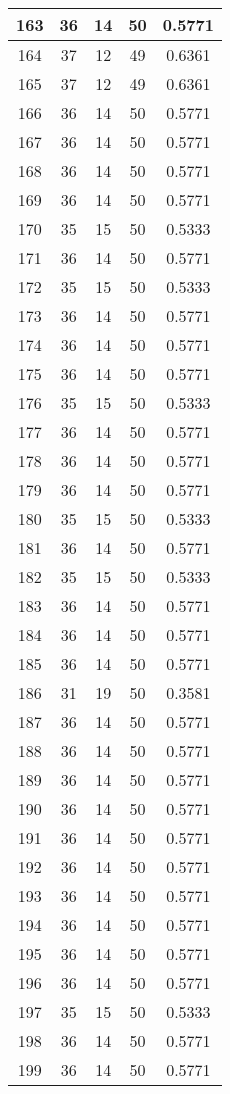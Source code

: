 \documentclass[letterpaper, 12pt]{article}
\begin{document}
\begin{longtable}{|c|c|c|c|c|}
\hline
163 & 36 & 14 & 50 & 0.5771 \\
\hline
164 & 37 & 12 & 49 & 0.6361 \\
\hline
165 & 37 & 12 & 49 & 0.6361 \\
\hline
166 & 36 & 14 & 50 & 0.5771 \\
\hline
167 & 36 & 14 & 50 & 0.5771 \\
\hline
168 & 36 & 14 & 50 & 0.5771 \\
\hline
169 & 36 & 14 & 50 & 0.5771 \\
\hline
170 & 35 & 15 & 50 & 0.5333 \\
\hline
171 & 36 & 14 & 50 & 0.5771 \\
\hline
172 & 35 & 15 & 50 & 0.5333 \\
\hline
173 & 36 & 14 & 50 & 0.5771 \\
\hline
174 & 36 & 14 & 50 & 0.5771 \\
\hline
175 & 36 & 14 & 50 & 0.5771 \\
\hline
176 & 35 & 15 & 50 & 0.5333 \\
\hline
177 & 36 & 14 & 50 & 0.5771 \\
\hline
178 & 36 & 14 & 50 & 0.5771 \\
\hline
179 & 36 & 14 & 50 & 0.5771 \\
\hline
180 & 35 & 15 & 50 & 0.5333 \\
\hline
181 & 36 & 14 & 50 & 0.5771 \\
\hline
182 & 35 & 15 & 50 & 0.5333 \\
\hline
183 & 36 & 14 & 50 & 0.5771 \\
\hline
184 & 36 & 14 & 50 & 0.5771 \\
\hline
185 & 36 & 14 & 50 & 0.5771 \\
\hline
186 & 31 & 19 & 50 & 0.3581 \\
\hline
187 & 36 & 14 & 50 & 0.5771 \\
\hline
188 & 36 & 14 & 50 & 0.5771 \\
\hline
189 & 36 & 14 & 50 & 0.5771 \\
\hline
190 & 36 & 14 & 50 & 0.5771 \\
\hline
191 & 36 & 14 & 50 & 0.5771 \\
\hline
192 & 36 & 14 & 50 & 0.5771 \\
\hline
193 & 36 & 14 & 50 & 0.5771 \\
\hline
194 & 36 & 14 & 50 & 0.5771 \\
\hline
195 & 36 & 14 & 50 & 0.5771 \\
\hline
196 & 36 & 14 & 50 & 0.5771 \\
\hline
197 & 35 & 15 & 50 & 0.5333 \\
\hline
198 & 36 & 14 & 50 & 0.5771 \\
\hline
199 & 36 & 14 & 50 & 0.5771 \\
\hline
\end{longtable}
\end{document}
